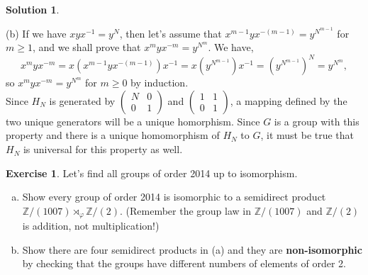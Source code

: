 \documentclass[10pt]{article}
\newcommand{\ZZ}{\mathbb Z}
\theoremstyle{Theorem}
\theoremstyle{definition}
\newtheorem{exe}{Exercise}
\newtheorem{sol}{Solution}
\theoremstyle{remark}
\theoremstyle{custom}
\begin{document}
\begin{sol}
\begin{description}
\item{(b)} If we have $xyx^{-1} = y^N$, then let's assume that $x^{m-1}yx^{-(m-1)} = y^{N^{m-1}}$ for $m\geq 1$, and we shall prove that $x^myx^{-m} = y^{N^m}$. We have,
\[x^myx^{-m} = x(x^{m-1}yx^{-(m-1)})x^{-1}=x(y^{N^{m-1}})x^{-1}=(y^{N^{m-1}})^N=y^{N^m},  \]
so $x^myx^{-m} = y^{N^m}$ for $m \geq 0$ by induction. \\
Since $H_N$ is generated by $(\begin{smallmatrix}N&0\\0&1\end{smallmatrix})$ and 
$(\begin{smallmatrix}1&1\\0&1\end{smallmatrix})$, a mapping defined by the two unique generators will be a unique homorphism. Since $G$ is a group with this property and there is a unique homomorphism of $H_N$ to $G$, it must be true that $H_N$ is universal for this property as well. 
\end{description}
\end{sol}

\begin{exe} 
Let's find all groups of order 2014 up to isomorphism.
\begin{enumerate}[(a)]

\item Show every group of order 2014 is isomorphic to a semidirect product $\ZZ/(1007) \rtimes_\varphi \ZZ/(2)$.
(Remember the group law in $\ZZ/(1007)$ and $\ZZ/(2)$ is addition, not multiplication!) 

\item Show there are four semidirect products in (a) and they are {\bf non-isomorphic} by checking that the groups 
have different numbers of elements of order 2. 
\end{enumerate}
\end{exe} 
\end{document}

